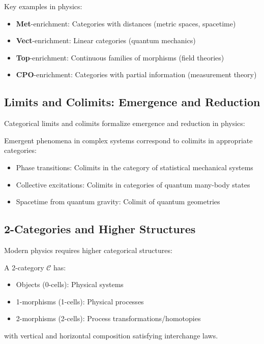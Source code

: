 Key examples in physics:
\begin{itemize}[leftmargin=*]
\item \textbf{Met}-enrichment: Categories with distances (metric spaces, spacetime)
\item \textbf{Vect}-enrichment: Linear categories (quantum mechanics)
\item \textbf{Top}-enrichment: Continuous families of morphisms (field theories)
\item \textbf{CPO}-enrichment: Categories with partial information (measurement theory)
\end{itemize}

\subsection{Limits and Colimits: Emergence and Reduction}

Categorical limits and colimits formalize emergence and reduction in physics:

\begin{theorem}
Emergent phenomena in complex systems correspond to colimits in appropriate categories:
\begin{itemize}
\item Phase transitions: Colimits in the category of statistical mechanical systems
\item Collective excitations: Colimits in categories of quantum many-body states
\item Spacetime from quantum gravity: Colimit of quantum geometries
\end{itemize}
\end{theorem}

\subsection{2-Categories and Higher Structures}

Modern physics requires higher categorical structures:

\begin{definition}[2-Category]
A 2-category $\mathcal{C}$ has:
\begin{itemize}
\item Objects (0-cells): Physical systems
\item 1-morphisms (1-cells): Physical processes
\item 2-morphisms (2-cells): Process transformations/homotopies
\end{itemize}
with vertical and horizontal composition satisfying interchange laws.
\end{definition}

